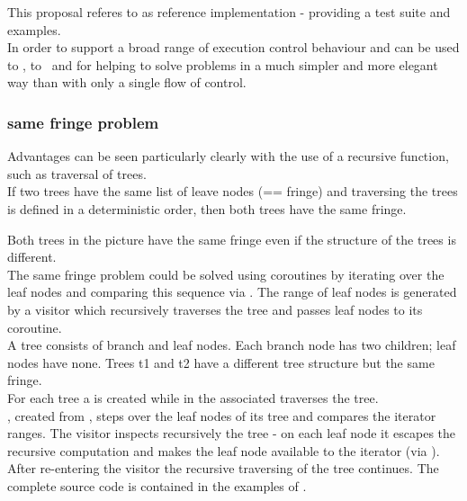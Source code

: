 
This proposal referes to \boostcoroutine as reference implementation - providing
a test suite and examples.\\
\newline
In order to support a broad range of execution control behaviour \pushcoro and
\pullcoro can be used to \escrecloops, to \escreccomps~and for \coopmultitasking
helping to solve problems in a much simpler and more elegant way than with only
a single flow of control.\\

\subsubsection*{same fringe problem}
Advantages can be seen particularly clearly with the use of a recursive
function, such as traversal of trees.\\
If two trees have the same list of leave nodes (== fringe) and traversing the
trees is defined in a deterministic order, then both trees have the same fringe.\\


Both trees in the picture have the same fringe even if the structure of the trees
is different.\\
\newline
The same fringe problem could be solved using coroutines by iterating over the
leaf nodes and comparing this sequence via . The range of leaf
nodes is generated by a visitor which recursively traverses the tree and passes
leaf nodes to its coroutine.\\
\newline
{}
A tree consists of branch and leaf nodes. Each branch node has two children;
leaf nodes have none. Trees t1 and t2 have a different tree structure but the
same fringe.\\
For each tree a \pullcoro is created while in the associated \corofunction
{} traverses the tree.\\
\coroiterator, created from \pullcoro, steps over the leaf nodes of its tree and
 compares the iterator ranges.
\newline
\newline
{}
The visitor inspects recursively the tree - on each leaf node it escapes the
recursive computation and makes the leaf node available to the iterator (via
\pushcoro). After re-entering the visitor the recursive traversing of the tree
continues.
\newline
The complete source code is contained in the examples of \boostcoroutine.

